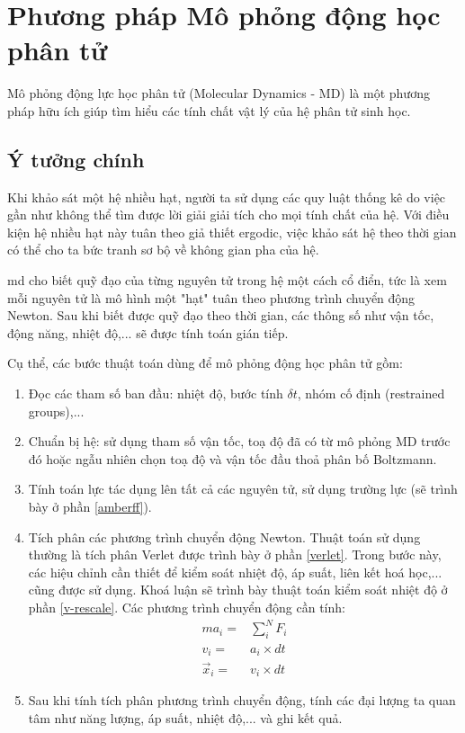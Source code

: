 \documentclass[12pt,a4paper,reqno, oneside]{book}
\begin{document}
\section{Phương pháp Mô phỏng động học phân tử}
Mô phỏng động lực học phân tử (Molecular Dynamics - MD) là một phương pháp hữu ích giúp tìm hiểu các tính chất vật lý của hệ phân tử sinh học.
	\subsection{Ý tưởng chính}
	
	Khi khảo sát một hệ nhiều hạt, người ta sử dụng các quy luật thống kê do việc gần như không thể tìm được lời giải giải tích cho mọi tính chất của hệ. Với điều kiện hệ nhiều hạt này tuân theo giả thiết ergodic, việc khảo sát hệ theo thời gian có thể cho ta bức tranh sơ bộ về không gian pha của hệ.
	
	\Gls{md} cho biết quỹ đạo của từng nguyên tử trong hệ một cách cổ điển, tức là xem mỗi nguyên tử là mô hình một "hạt" tuân theo phương trình chuyển động Newton. Sau khi biết được quỹ đạo theo thời gian, các thông số như vận tốc, động năng, nhiệt độ,... sẽ được tính toán gián tiếp.
	
	Cụ thể, các bước thuật toán dùng để mô phỏng động học phân tử gồm:
	\begin{enumerate}
	\item Đọc các tham số ban đầu: nhiệt độ, bước tính $\delta t$, nhóm cố định (restrained groups),...
	\item Chuẩn bị hệ: sử dụng tham số vận tốc, toạ độ đã có từ mô phỏng MD trước đó hoặc ngẫu nhiên chọn toạ độ và vận tốc đầu thoả phân bố Boltzmann.
	\item Tính toán lực tác dụng lên tất cả các nguyên tử, sử dụng trường lực (sẽ trình bày ở phần \ref{amberff}).
	\item Tích phân các phương trình chuyển động Newton. Thuật toán sử dụng thường là tích phân Verlet được trình bày ở phần \ref{verlet}. Trong bước này, các hiệu chỉnh cần thiết để kiểm soát nhiệt độ, áp suất, liên kết hoá học,... cũng được sử dụng. Khoá luận sẽ trình bày thuật toán kiểm soát nhiệt độ ở phần \ref{v-rescale}. Các phương trình chuyển động cần tính:
	\begin{eqnarray}
	\label{force}
	m a_{i} = & \sum_{i}^{N} F_{i} \\
	\label{velocity}
	v_{i} = & a_{i}\times dt \\
	\vec{x}_{i} = & v_{i}\times dt
	\label{coordinate}
	\end{eqnarray}
	\item Sau khi tính tích phân phương trình chuyển động, tính các đại lượng ta quan tâm như năng lượng, áp suất, nhiệt độ,... và ghi kết quả.
	\end{enumerate}
	
\end{document}
